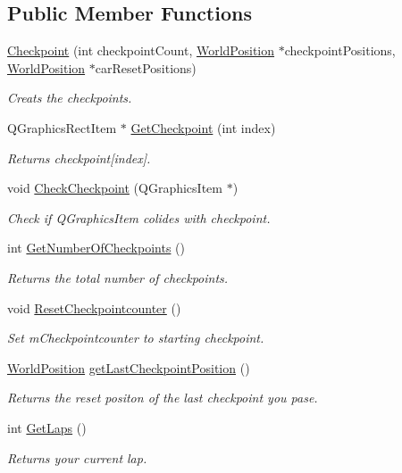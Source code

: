\subsection*{Public Member Functions}
\begin{DoxyCompactItemize}
\item 
\mbox{\hyperlink{class_checkpoint_a3fa7339814d14ec419786d780a021bfe}{Checkpoint}} (int checkpoint\+Count, \mbox{\hyperlink{class_world_position}{World\+Position}} $\ast$checkpoint\+Positions, \mbox{\hyperlink{class_world_position}{World\+Position}} $\ast$car\+Reset\+Positions)
\begin{DoxyCompactList}\small\item\em Creats the checkpoints. \end{DoxyCompactList}\item 
Q\+Graphics\+Rect\+Item $\ast$ \mbox{\hyperlink{class_checkpoint_a7e0785010e4a35ce3825d22322dbd449}{Get\+Checkpoint}} (int index)
\begin{DoxyCompactList}\small\item\em Returns checkpoint\mbox{[}index\mbox{]}. \end{DoxyCompactList}\item 
void \mbox{\hyperlink{class_checkpoint_a732f2efc4cf24128cc9c604091a53c5d}{Check\+Checkpoint}} (Q\+Graphics\+Item $\ast$)
\begin{DoxyCompactList}\small\item\em Check if Q\+Graphics\+Item colides with checkpoint. \end{DoxyCompactList}\item 
int \mbox{\hyperlink{class_checkpoint_afcc076878559f9e2d738d79759c462f0}{Get\+Number\+Of\+Checkpoints}} ()
\begin{DoxyCompactList}\small\item\em Returns the total number of checkpoints. \end{DoxyCompactList}\item 
void \mbox{\hyperlink{class_checkpoint_aa0dd569d6b9091e07500891692b4d520}{Reset\+Checkpointcounter}} ()
\begin{DoxyCompactList}\small\item\em Set m\+Checkpointcounter to starting checkpoint. \end{DoxyCompactList}\item 
\mbox{\hyperlink{class_world_position}{World\+Position}} \mbox{\hyperlink{class_checkpoint_a13fd023c0131da6fb54ae699fbd68049}{get\+Last\+Checkpoint\+Position}} ()
\begin{DoxyCompactList}\small\item\em Returns the reset positon of the last checkpoint you pase. \end{DoxyCompactList}\item 
int \mbox{\hyperlink{class_checkpoint_acb598b1238d4760ba1fceca3744f3634}{Get\+Laps}} ()
\begin{DoxyCompactList}\small\item\em Returns your current lap. \end{DoxyCompactList}\end{DoxyCompactItemize}


